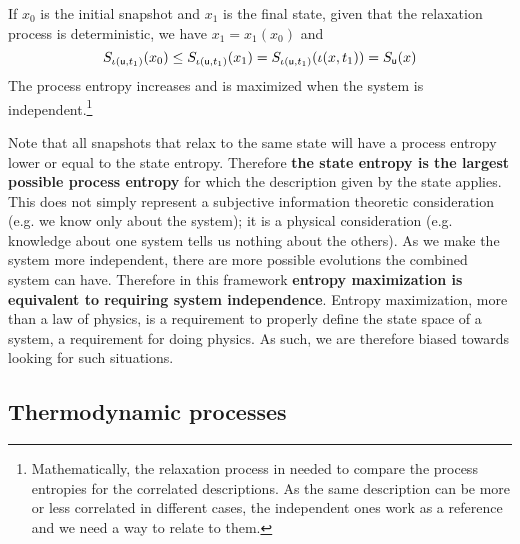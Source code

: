 \documentclass[letterpaper]{article}
\begin{document}
If $x_0$ is the initial snapshot and $x_1$ is the final state, given that the relaxation process is deterministic, we have $x_1= x_1(x_0)$ and 
\begin{equation}
S_{\iota(\stmt[u], t_1)}(x_0) \leq S_{\iota(\stmt[u], t_1)}(x_1) = S_{\iota(\stmt[u], t_1)}(\iota( x, t_1)) = S_{\stmt[u]}(x)
\end{equation}
The process entropy increases and is maximized when the system is independent.\footnote{Mathematically, the relaxation process in needed to compare the process entropies for the correlated descriptions. As the same description can be more or less correlated in different cases, the independent ones work as a reference and we need a way to relate to them.}

Note that all snapshots that relax to the same state will have a process entropy lower or equal to the state entropy. Therefore \textbf{the state entropy is the largest possible process entropy} for which the description given by the state applies. This does not simply represent a subjective information theoretic consideration (e.g. we know only about the system); it is a physical consideration (e.g. knowledge about one system tells us nothing about the others). As we make the system more independent, there are more possible evolutions the combined system can have. Therefore in this framework \textbf{entropy maximization is equivalent to requiring system independence}. Entropy maximization, more than a law of physics, is a requirement to properly define the state space of a system, a requirement for doing physics. As such, we are therefore biased towards looking for such situations.


\subsection{Thermodynamic processes}





\end{document}
